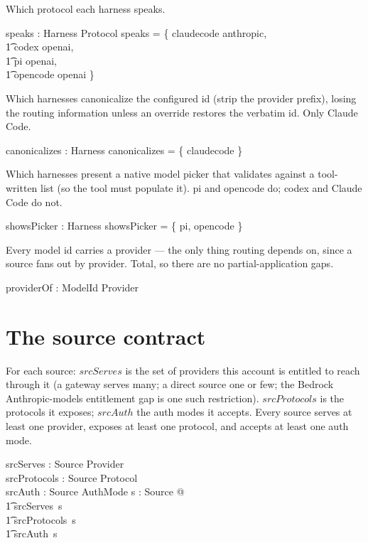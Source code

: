 \documentclass{article}
\begin{document}
Which protocol each harness speaks.

\begin{axdef}
	speaks : Harness \fun Protocol
	\where
	speaks = \{ claudecode \mapsto anthropic, \\
	\t1         codex \mapsto openai, \\
	\t1         pi \mapsto openai, \\
	\t1         opencode \mapsto openai \}
\end{axdef}

Which harnesses canonicalize the configured id (strip the provider prefix),
losing the routing information unless an override restores the verbatim id. Only
Claude Code.

\begin{axdef}
	canonicalizes : \power Harness
	\where
	canonicalizes = \{ claudecode \}
\end{axdef}

Which harnesses present a native model picker that validates against a
tool-written list (so the tool must populate it). pi and opencode do; codex and
Claude Code do not.

\begin{axdef}
	showsPicker : \power Harness
	\where
	showsPicker = \{ pi, opencode \}
\end{axdef}

Every model id carries a provider --- the only thing routing depends on, since a
source fans out by provider. Total, so there are no partial-application gaps.

\begin{axdef}
	providerOf : ModelId \fun Provider
\end{axdef}

\section{The source contract}

For each source: $srcServes$ is the set of providers this account is entitled to
reach through it (a gateway serves many; a direct source one or few; the Bedrock
Anthropic-models entitlement gap is one such restriction). $srcProtocols$ is the
protocols it exposes; $srcAuth$ the auth modes it accepts. Every source serves at
least one provider, exposes at least one protocol, and accepts at least one auth
mode.

\begin{axdef}
	srcServes : Source \fun \power Provider \\
	srcProtocols : Source \fun \power Protocol \\
	srcAuth : Source \fun \power AuthMode
	\where
	\forall s : Source @ \\
	\t1 srcServes~s \neq \emptyset \land \\
	\t1 srcProtocols~s \neq \emptyset \land \\
	\t1 srcAuth~s \neq \emptyset
\end{axdef}
\end{document}
